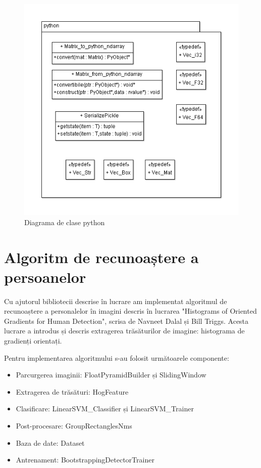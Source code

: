 \begin{figure}[H]
	\centering
		\includegraphics[width=1.00\textwidth]{uml/PythonClassDiagram.png}
	\caption{Diagrama de clase python}
	\label{fig:PythonClassDiagram}
\end{figure}




\pagebreak
\section{Algoritm de recunoaștere a persoanelor}

Cu ajutorul bibliotecii descrise în lucrare am implementat algoritmul de recunoaștere a personalelor în imagini descris în lucrarea "Histograms of Oriented Gradients for Human Detection", scrisa de Navneet Dalal și Bill Triggs.\cite{Dalal05histogramsof}
Acesta lucrare a introdus și descris extragerea trăsăturilor de imagine: histograma de gradienți orientați.

Pentru implementarea algoritmului s-au folosit următoarele componente:
\begin{itemize}
	\item Parcurgerea imaginii: FloatPyramidBuilder și SlidingWindow
	\item Extragerea de trăsături: HogFeature
	\item Clasificare: LinearSVM\_Classifier și LinearSVM\_Trainer
	\item Post-procesare: GroupRectanglesNms
	\item Baza de date: Dataset
	\item Antrenament: BootstrappingDetectorTrainer
\end{itemize}

